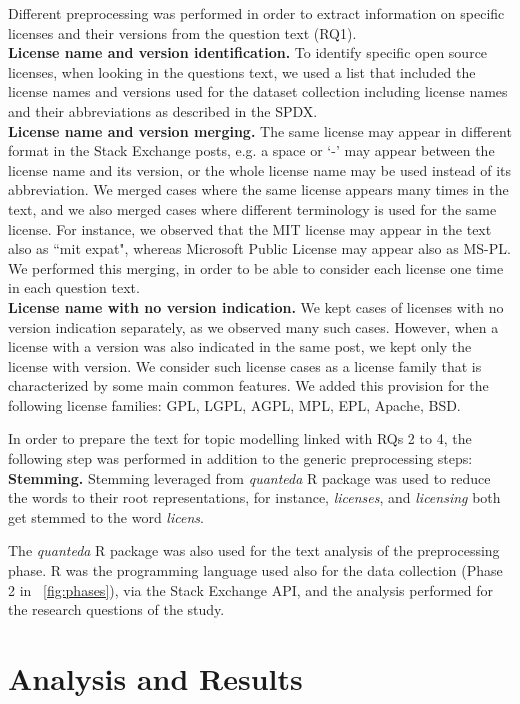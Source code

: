 \documentclass{elsarticle}
\begin{document}
Different preprocessing was performed in order to extract information on specific licenses and their versions from the question text (RQ1). \\
\textbf{License name and version identification.} To identify specific open source licenses, when looking in the questions text, we used a list that included the license names and versions used for the dataset collection including license names and their abbreviations as described in the SPDX. \\
\textbf{License name and version merging.} The same license may appear in different format in the Stack Exchange posts, e.g. a space or `-' may appear between the license name and its version, or the whole license name may be used instead of its abbreviation. We merged cases where the same license appears many times in the text, and we also merged cases where different terminology is used for the same license. For instance, we observed that the MIT license may appear in the text also as ``mit expat", whereas Microsoft Public License may appear also as MS-PL. We performed this merging, in order to be able to consider each license one time in each question text.\\
\textbf{License name with no version indication.} We kept cases of licenses with no version indication separately, as we observed many such cases. However, when a license with a version was also indicated in the same post, we kept only the license with version. We consider such license cases as a license family that is characterized by some main common features. We added this provision for the following license families: GPL, LGPL, AGPL, MPL, EPL, Apache, BSD.

In order to prepare the text for topic modelling linked with RQs 2 to 4, the following step was performed in addition to the generic preprocessing steps: \\
\textbf{Stemming.} Stemming leveraged from \emph{quanteda} R package was used to reduce the words to their root representations, for instance, \emph{licenses}, and \emph{licensing} both get stemmed to the word \emph{licens}.

The \emph{quanteda} R package was also used for the text analysis of the preprocessing phase. R was the programming language used also for the data  collection (Phase 2 in \figurename~\ref{fig:phases}), via the Stack Exchange API, and the analysis performed for the research questions of the study.

\section{Analysis and Results}
\end{document}
